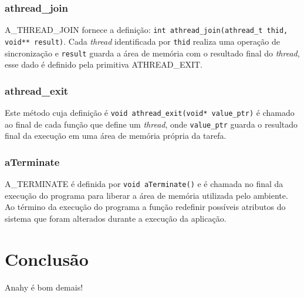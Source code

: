 \documentclass[12pt]{article}
\begin{document}
\subsubsection*{athread\_join}

A\_THREAD\_JOIN fornece a definição: \texttt{int athread\_join(athread\_t thid, void** result)}. Cada \emph{thread} identificada por
\texttt{thid} realiza uma operação de sincronização e \texttt{result} guarda a área de memória com o resultado final do \emph{thread}, 
esse dado é definido pela primitiva ATHREAD\_EXIT.

\subsubsection*{athread\_exit}

Este método cuja definição é \texttt{void athread\_exit(void* value\_ptr)} é chamado ao final de cada função que define um \emph{thread},
onde \texttt{value\_ptr} guarda o resultado final da execução em uma área de memória própria da tarefa.

\subsubsection*{aTerminate}

A\_TERMINATE é definida por \texttt{void aTerminate()} e é chamada no final da execução do programa para liberar a área de memória 
utilizada pelo ambiente. Ao término da execução do programa a função redefinir possíveis atributos do sistema que foram alterados 
durante a execução da aplicação.



\section{Conclusão} %
\label{sec:conclusao}

Anahy é bom demais!




\end{document}
